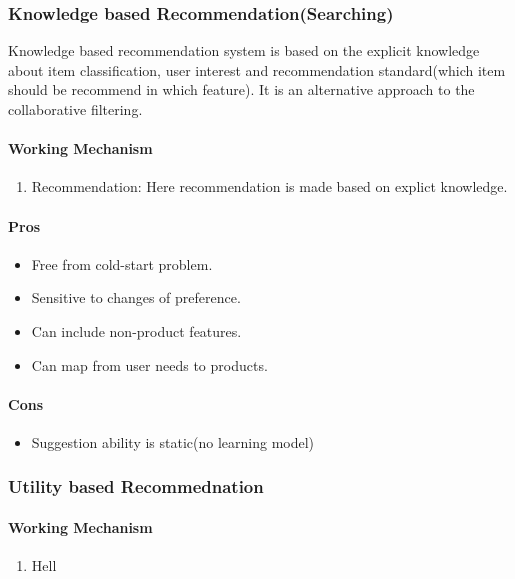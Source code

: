\subsubsection{Knowledge based Recommendation(Searching)}
Knowledge based recommendation system is based on the explicit knowledge about item classification, user interest and recommendation standard(which item should be recommend in which feature). It is an alternative approach to the collaborative filtering.
\paragraph{Working Mechanism}\hfill

\begin{enumerate}
	\item Recommendation: Here recommendation is made based on explict knowledge.
\end{enumerate}
\paragraph{Pros}\hfill

\begin{itemize}
	\item Free from cold-start problem.
	\item Sensitive to changes of preference.
	\item Can include non-product features.
	\item Can map from user needs to products.
\end{itemize}
\paragraph{Cons}\hfill

\begin{itemize}
	\item Suggestion ability is static(no learning model)
\end{itemize}

\subsubsection{Utility based Recommednation}
\paragraph{Working Mechanism}\hfill
\begin{enumerate}
	\item Hell
\end{enumerate}
